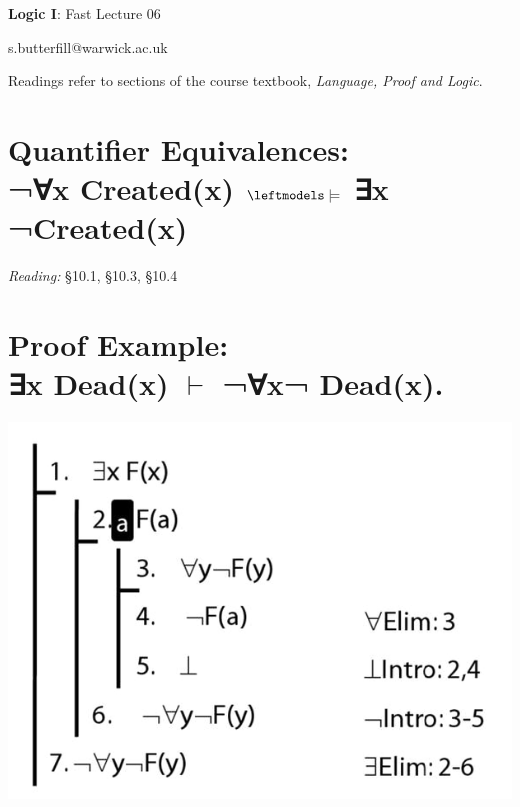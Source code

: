 \documentclass[12pt]{extarticle}
\date{}
\makeatletter
\def \ititle {Origins of Mind}
\def \isubtitle {Lecture 08}
\def \iemail{s.butterfill@warwick.ac.uk}
\makeatother
\begin{document}
\raggedcolumns

\begin{multicols*}{3}

\setlength\footnotesep{1em}








\def \ititle {Logic I}
 
\def \isubtitle {Fast Lecture 06}
 
\begin{center}
 
{\Large
 
\textbf{\ititle}: \isubtitle
 
}
 
 
 
\iemail %
 
\end{center}
 
Readings refer to sections of the course textbook, \emph{Language, Proof and Logic}.
 
 
 
\section{Quantifier Equivalences: \\ ¬∀x Created(x) $\leftmodels\models$ ∃x ¬Created(x)}
 
\emph{Reading:} §10.1, §10.3, §10.4
 
 
 
\section{Proof Example: \\ ∃x Dead(x) $\vdash$ ¬∀x¬ Dead(x).}
 
\begin{center}
\includegraphics[scale=0.3]{img/unit_825_proof.png}
\end{center}
 

\end{multicols*}
\end{document}
